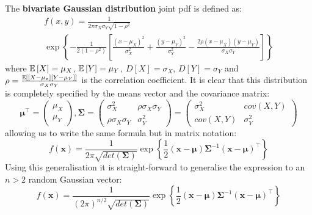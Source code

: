 \begin{definition}
    The \textbf{bivariate Gaussian distribution} joint pdf is defined as:
    \begin{multline*}
        f(x,y) = \frac{1}{2\pi\sigma_X\sigma_Y\sqrt{1-\rho^2}}\\\exp\left\{-\frac{1}{2(1-\rho^2)}\left[\frac{(x-\mu_X)^2}{\sigma^2_X}+\frac{(y-\mu_Y)^2}{\sigma^2_Y}-\frac{2\rho(x-\mu_X)(y-\mu_Y)}{\sigma_X\sigma_Y}\right]\right\}
    \end{multline*}
    where $\mathbb{E}\left[X\right]=\mu_X$, $\mathbb{E}\left[Y\right]=\mu_Y$, $D[X]=\sigma_X$, $D[Y]=\sigma_Y$ and $\rho=\frac{\mathbb{E}\left[[X-\mu_x][Y-\mu_Y]\right]}{\sigma_X\sigma_Y}$ is the correlation coefficient.
    It is clear that this distribution is completely specified by the means vector and the covariance matrix:
    \begin{equation*}
        \boldsymbol{\mu}^\intercal=
        \begin{pmatrix}
            \mu_X\\
            \mu_Y
        \end{pmatrix}
        , 
        \boldsymbol{\Sigma}=
        \begin{pmatrix}
            \sigma^2_X & \rho\sigma_X\sigma_Y\\
            \rho\sigma_X\sigma_Y & \sigma^2_Y
        \end{pmatrix}
        =
        \begin{pmatrix}
            \sigma^2_X & cov(X, Y)\\
            cov(X, Y) & \sigma^2_Y
        \end{pmatrix}
    \end{equation*}
    allowing us to write the same formula but in matrix notation:
    \begin{equation*}
        f(\boldsymbol{x})=\frac{1}{2\pi\sqrt{det(\boldsymbol{\Sigma})}}\exp\left\{\frac{1}{2}(\boldsymbol{x}-\boldsymbol{\mu})\boldsymbol{\Sigma}^{-1}(\boldsymbol{x}-\boldsymbol{\mu})^\intercal\right\}
    \end{equation*}
    Using this generalisation it is straight-forward to generalise the expression to an $n>2$ random Gaussian vector:
    \begin{equation*}
        f(\boldsymbol{x})=\frac{1}{(2\pi)^{n/2}\sqrt{det(\boldsymbol{\Sigma})}}\exp\left\{\frac{1}{2}(\boldsymbol{x}-\boldsymbol{\mu})\boldsymbol{\Sigma}^{-1}(\boldsymbol{x}-\boldsymbol{\mu})^\intercal\right\}
    \end{equation*}
\end{definition}

